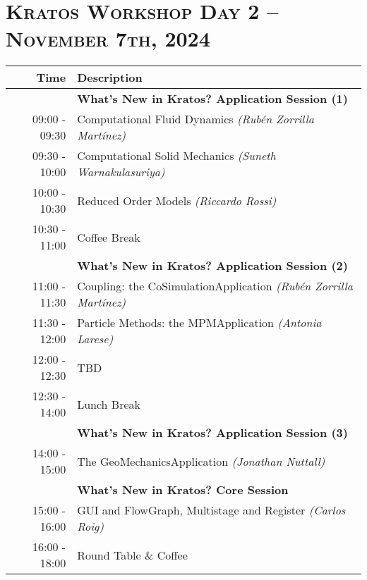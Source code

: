 \documentclass{article}
\begin{document}
\newpage
\section*{\centering \textsc{Kratos Workshop Day 2 -- November 7th, 2024}}

\begin{table}[h]\centering
   \begin{tabularx}{0.85\textwidth}{r|X}
      \toprule\rule{0mm}{5mm}
      {\large Time} & {\large Description} \\[1ex]
      \midrule\rule{0mm}{5mm}
                    & {\large \textbf{What's New in Kratos? Application Session (1)}} \\[1ex]
      09:00 - 09:30 & Computational Fluid Dynamics \textit{(Rubén Zorrilla Martínez)}\\[1ex]
      09:30 - 10:00 & Computational Solid Mechanics \textit{(Suneth Warnakulasuriya)}\\[1ex]
      10:00 - 10:30 & Reduced Order Models \textit{(Riccardo Rossi)}\\[1ex]
      \midrule\rule{0mm}{5mm}
      10:30 - 11:00 & Coffee Break \\[1ex]
      \midrule\rule{0mm}{5mm}
                    & {\large \textbf{What's New in Kratos? Application Session (2)}} \\[1ex]
      11:00 - 11:30 & Coupling: the CoSimulationApplication \textit{(Rubén Zorrilla Martínez)}\\[1ex]
      11:30 - 12:00 & Particle Methods: the MPMApplication \textit{(Antonia Larese)}\\[1ex]
      12:00 - 12:30 & TBD \\[1ex]
      \midrule\rule{0mm}{5mm}
      12:30 - 14:00 & Lunch Break \\[1ex]
      \midrule\rule{0mm}{5mm}
                    & {\large \textbf{What's New in Kratos? Application Session (3)}} \\[1ex]
      14:00 - 15:00 & The GeoMechanicsApplication \textit{(Jonathan Nuttall)}\\[1ex]
      \midrule\rule{0mm}{5mm}
                    & {\large \textbf{What's New in Kratos? Core Session}} \\[1ex]
      15:00 - 16:00 & GUI and FlowGraph, Multistage and Register \textit{(Carlos Roig)}\\[1ex]
      \midrule\rule{0mm}{5mm}
      16:00 - 18:00 & Round Table \& Coffee \\[1ex]
      \bottomrule
   \end{tabularx}
\end{table}
\end{document}
